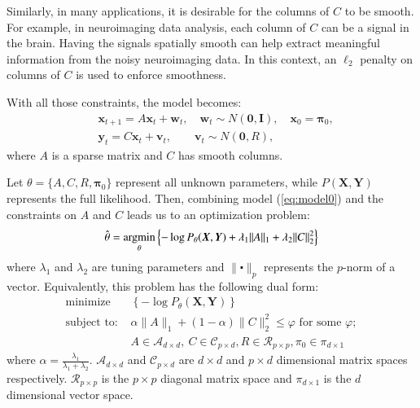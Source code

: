 \documentclass[times,twocolumn,final,authoryear]{elsarticle}
\providecommand{\mb}[1]{\boldsymbol{#1}}
\newcommand{\bx}{\mb{x}}
\newcommand{\by}{\mb{y}}
\newcommand{\bX}{\mb{X}}
\newcommand{\bY}{\mb{Y}}
\newcommand{\argmin}{\operatornamewithlimits{argmin}}
\let\oldref\ref
\renewcommand{\ref}[1]{(\oldref{#1})}
\begin{document}
Similarly, in many applications, it is desirable for the columns of $C$ to be smooth. For example, in neuroimaging data analysis, each column of $C$ can be a signal in the brain. Having the signals spatially smooth can help extract meaningful information from the noisy neuroimaging data. In this context, an $\ell_2$ penalty on columns of $C$ is used to enforce smoothness.

With all those constraints, the model becomes:
\begin{equation}\label{eq:model0}
\begin{aligned}
	&\bx_{t+1}=A\bx_{t}+\mathbf{w}_t, \quad \mathbf{w}_t\sim N(\mathbf{0},\mathbf{I}),\quad \bx_0 = \mathbf{\pi}_0,\\
	&\by_t=C\bx_t+\mathbf{v}_t,\qquad \mathbf{v}_t\sim N(\mathbf{0},R),
\end{aligned}
\end{equation}
where $A$ is a sparse matrix and $C$ has smooth columns.

Let $\theta =\{A,C,R,\mathbf{\pi}_0\}$ represent all unknown parameters, while $P(\bX,\bY)$ represents the full likelihood. Then, combining model \ref{eq:model0} and the constraints on $A$ and $C$ leads us to an optimization problem:
\begin{equation}\label{eqn:penaltylik}
\hat{\theta}=\argmin_{\substack{\theta}}\left\{-\log P_\theta(\bX,\bY)+\lambda_1\|A\|_1+\lambda_2\|C\|_2^2\right\}
\end{equation}
where $\lambda_1$ and $\lambda_2$ are tuning parameters and $\|\centerdot\|_p$ represents the $p$-norm of a vector. Equivalently, this problem has the following dual form:
\begin{equation*}\label{eqn:penaltylikdual}
\begin{aligned}
&\text{minimize}&\left\{-\log P_\theta(\bX,\bY)\right\}&\\
&\text{subject to: }
& \alpha\|A\|_1+ (1-\alpha)\|C\|_2^2 \leq \varphi \text{ for some }\varphi; &\\
&& A\in \mathcal{A}_{d\times d},\ C \in \mathcal{C}_{p \times d}, R \in \mathcal{R}_{p\times p}, \pi_0 \in \mathcal{\pi}_{d\times 1}&
\end{aligned}
\end{equation*}
where $\alpha = \frac{\lambda_1}{\lambda_1 + \lambda_2}$. $\mathcal{A}_{d\times d}$ and $\mathcal{C}_{p \times d}$ are $d\times d$ and $p \times d$ dimensional matrix spaces respectively. $\mathcal{R}_{p \times p}$ is the $p \times p$ diagonal matrix space and $\mathcal{\pi}_{d\times 1}$ is the $d$ dimensional vector space.
\end{document}
